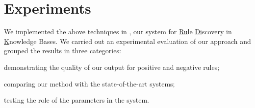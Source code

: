 \section{Experiments} \label{sec:krd_experiments}
We implemented the above techniques in \krd, our system for \underline{Ru}le \underline{Di}scovery in \underline{K}nowledge Bases.
We carried out an %
experimental evaluation of our approach and grouped the results in three categories: 
\begin{inparaenum}[\itshape(i)]
	\item demonstrating the quality of our output for positive and negative rules;
	\item comparing our method with the state-of-the-art systems;
	\item testing the role of the parameters in the system. %
\end{inparaenum}

